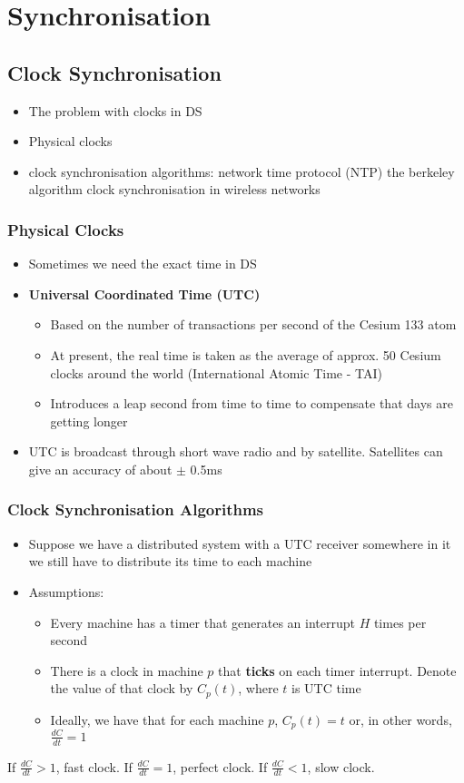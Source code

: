 \section{Synchronisation}
\subsection{Clock Synchronisation}
\begin{itemize}
	\item The problem with clocks in DS
	\item Physical clocks
	\item clock synchronisation algorithms:
	\subitem network time protocol (NTP)
	\subitem the berkeley algorithm
	\subitem clock synchronisation in wireless networks	
\end{itemize}

\subsubsection{Physical Clocks}
\begin{itemize}
	\item Sometimes we need the exact time in DS
	\item \textbf{Universal Coordinated Time (UTC)}
	\begin{itemize}
		\item Based on the number of transactions per second of the Cesium 133 atom
		\item At present, the real time is taken as the average of approx. 50 Cesium clocks around the world (International Atomic Time - TAI)
		\item Introduces a leap second from time to time to compensate that days are getting longer
	\end{itemize}
	\item UTC is broadcast through short wave radio and by satellite. Satellites can give an accuracy of about $\pm$ 0.5ms	
\end{itemize}

\subsubsection{Clock Synchronisation Algorithms}
\begin{itemize}
	\item Suppose we have a distributed system with a UTC receiver somewhere in it we still have to distribute its time to each machine
	\item Assumptions:
	\begin{itemize}
		\item Every machine has a timer that generates an interrupt $H$ times per second
		\item There is a clock in machine $p$ that \textbf{ticks} on each timer interrupt. Denote the value of that clock by $C_p(t)$, where $t$ is UTC time
		\item Ideally, we have that for each machine $p$, $C_p(t)=t$ or, in other words, $\frac{dC}{dt}=1$	
	\end{itemize}
\end{itemize}
If $\frac{dC}{dt}>1$, fast clock. If $\frac{dC}{dt} = 1$, perfect clock. If $\frac{dC}{dt} < 1$, slow clock.

